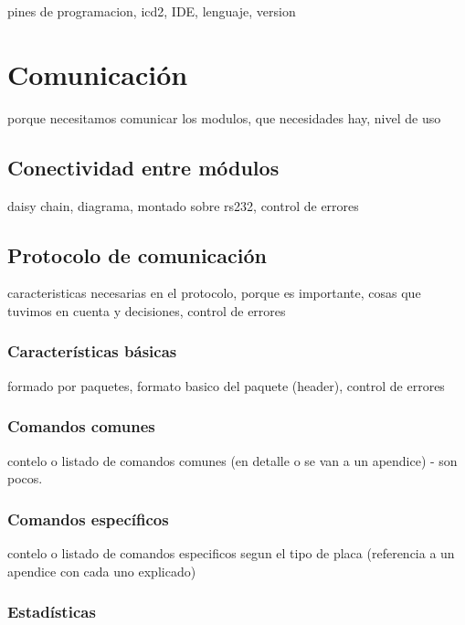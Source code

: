 pines de programacion, icd2, IDE, lenguaje, version

\section{Comunicaci\'on}
\label{h_comm}

porque necesitamos comunicar los modulos, que necesidades hay, nivel de uso

\subsection{Conectividad entre m\'odulos}
\label{h_comm_conectividad}

daisy chain, diagrama, montado sobre rs232, control de errores

\subsection{Protocolo de comunicaci\'on}
\label{h_comm_protocolo}

caracteristicas necesarias en el protocolo, porque es importante, cosas que tuvimos en cuenta y decisiones, control de errores

\subsubsection{Caracter\'isticas b\'asicas}
\label{h_comm_protocolo_caracteristicas}

formado por paquetes, formato basico del paquete (header), control de errores

\subsubsection{Comandos comunes}
\label{h_comm_protocolo_comandosComunes}

contelo o listado de comandos comunes (en detalle o se van a un apendice) - son pocos.

\subsubsection{Comandos espec\'ificos}
\label{h_comm_protocolo_comandosEspecificos}

contelo o listado de comandos especificos segun el tipo de placa (referencia a un apendice con cada uno explicado)

\subsubsection{Estad\'isticas}
\label{h_comm_protocolo_estadisticas}

